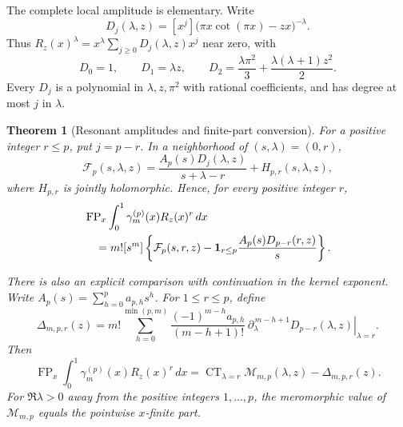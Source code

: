 \documentclass[11pt]{article}
\numberwithin{equation}{section}
\theoremstyle{plain}
\newtheorem{theorem}{Theorem}[section]
\theoremstyle{definition}
\theoremstyle{remark}
\begin{document}
The complete local amplitude is elementary.  Write
\begin{equation}\label{bhr:cxp:eq:d}
 D_j(\lambda,z)
 =[x^j]\bigl(\pi x\cot(\pi x)-zx\bigr)^{-\lambda}.
\end{equation}
Thus \(R_z(x)^\lambda
=x^\lambda\sum_{j\ge0}D_j(\lambda,z)x^j\) near zero, with
\[
 D_0=1,\qquad D_1=\lambda z,\qquad
 D_2=\frac{\lambda\pi^2}{3}
       +\frac{\lambda(\lambda+1)z^2}{2}.
\]
Every \(D_j\) is a polynomial in \(\lambda,z,\pi^2\) with rational
coefficients, and has degree at most \(j\) in \(\lambda\).

\begin{theorem}[Resonant amplitudes and finite-part conversion]
\label{bhr:cxp:thm:contacts}
For a positive integer \(r\le p\), put \(j=p-r\).
In a neighborhood of \((s,\lambda)=(0,r)\),
\begin{equation}\label{bhr:cxp:eq:amplitude}
 \mathcal F_p(s,\lambda,z)
  =\frac{A_p(s)D_j(\lambda,z)}{s+\lambda-r}
      +H_{p,r}(s,\lambda,z),
\end{equation}
where \(H_{p,r}\) is jointly holomorphic.  Hence, for every
positive integer \(r\),
\begin{align}
 &\operatorname{FP}_x\int_0^1
       \gamma_m^{(p)}(x)R_z(x)^r\,dx\notag\\
 &\quad =
 m![s^m]\left\{
   \mathcal F_p(s,r,z)
   -\mathbf1_{r\le p}\frac{A_p(s)D_{p-r}(r,z)}s
           \right\}. \label{bhr:cxp:eq:fixed-r}
\end{align}

There is also an explicit comparison with continuation in the
kernel exponent.  Write \(A_p(s)=\sum_{h=0}^p a_{p,h}s^h\).
For \(1\le r\le p\), define
\begin{equation}\label{bhr:cxp:eq:Delta}
 \Delta_{m,p,r}(z)=m!
 \sum_{h=0}^{\min(p,m)}
 \frac{(-1)^{m-h}a_{p,h}}{(m-h+1)!}\,
 \left.\partial_\lambda^{\,m-h+1}
                 D_{p-r}(\lambda,z)\right|_{\lambda=r}.
\end{equation}
Then
\begin{equation}\label{bhr:cxp:eq:lambdaCT}
 \operatorname{FP}_x\int_0^1
   \gamma_m^{(p)}(x)R_z(x)^r\,dx
 =\operatorname{CT}_{\lambda=r}
      \mathcal M_{m,p}(\lambda,z)-\Delta_{m,p,r}(z).
\end{equation}
For \(\Re\lambda>0\) away from the positive integers
\(1,\ldots,p\), the meromorphic value of
\(\mathcal M_{m,p}\) equals the pointwise \(x\)-finite part.
\end{theorem}
\end{document}
